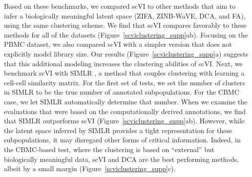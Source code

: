 Based on these benchmarks, we compared scVI to other methods that aim to infer a biologically meaningful latent space (ZIFA, ZINB-WaVE, DCA, and FA), using the same clustering scheme. We find that scVI compares favorably to these methods for all of the datasets (Figure~\ref{scviclustering_supp}ab). Focusing on the PBMC dataset, we also compared scVI with a simpler version that does not explicitly model library size. Our results (Figure~\ref{scviclustering_supp}a) suggests that this additional modeling increases the clustering abilities of scVI. Next, we benchmark scVI with SIMLR \cite{Wang2017}, a method that couples clustering with learning a cell-cell similarity matrix. For the first set of tests, we set the number of clusters in SIMLR to be the true number of annotated subpopulations. For the CBMC case, we let SIMLR automatically determine that number. When we examine the evaluations that were based on the computationally derived annotations, we find that SIMLR outperforms scVI (Figure~\ref{scviclustering_supp}ab). However, while the latent space inferred by SIMLR provides a tight representation for these subpopulations, it may disregard other forms of critical information. Indeed, in the CBMC-based test, where the clustering is based on ``external'' but biologically meaningful data, scVI and DCA are the best performing methods, albeit by a small margin (Figure~\ref{scviclustering_supp}c).

